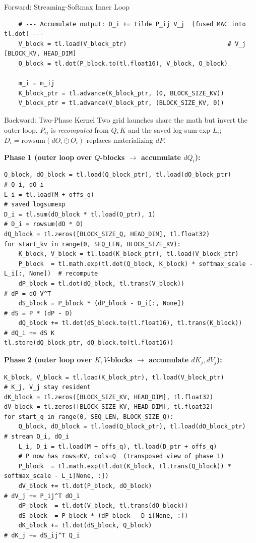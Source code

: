 \begin{frame}[fragile]{Forward: Streaming-Softmax Inner Loop}
\begin{lstlisting}
    # --- Accumulate output: O_i += tilde P_ij V_j  (fused MAC into tl.dot) ---
    V_block = tl.load(V_block_ptr)                            # V_j   [BLOCK_KV, HEAD_DIM]
    O_block = tl.dot(P_block.to(tl.float16), V_block, O_block)

    m_i = m_ij
    K_block_ptr = tl.advance(K_block_ptr, (0, BLOCK_SIZE_KV))
    V_block_ptr = tl.advance(V_block_ptr, (BLOCK_SIZE_KV, 0))
\end{lstlisting}
\end{frame}

\begin{frame}[fragile]{Backward: Two-Phase Kernel}
  Two grid launches share the math but invert the outer loop. $P_{ij}$ is
  \emph{recomputed} from $Q,K$ and the saved log-sum-exp $L_i$;
  $D_i = \mathrm{rowsum}(dO_i \odot O_i)$ replaces materializing $dP$.

  \textbf{Phase 1 (outer loop over $Q$-blocks $\to$ accumulate $dQ_i$):}
\begin{lstlisting}
Q_block, dO_block = tl.load(Q_block_ptr), tl.load(dO_block_ptr)        # Q_i, dO_i
L_i = tl.load(M + offs_q)                                              # saved logsumexp
D_i = tl.sum(dO_block * tl.load(O_ptr), 1)                             # D_i = rowsum(dO * O)
dQ_block = tl.zeros([BLOCK_SIZE_Q, HEAD_DIM], tl.float32)
for start_kv in range(0, SEQ_LEN, BLOCK_SIZE_KV):
    K_block, V_block = tl.load(K_block_ptr), tl.load(V_block_ptr)
    P_block  = tl.math.exp(tl.dot(Q_block, K_block) * softmax_scale - L_i[:, None])  # recompute
    dP_block = tl.dot(dO_block, tl.trans(V_block))                     # dP = dO V^T
    dS_block = P_block * (dP_block - D_i[:, None])                     # dS = P * (dP - D)
    dQ_block += tl.dot(dS_block.to(tl.float16), tl.trans(K_block))     # dQ_i += dS K
tl.store(dQ_block_ptr, dQ_block.to(tl.float16))
\end{lstlisting}

  \textbf{Phase 2 (outer loop over $K,V$-blocks $\to$ accumulate $dK_j, dV_j$):}
\begin{lstlisting}
K_block, V_block = tl.load(K_block_ptr), tl.load(V_block_ptr)          # K_j, V_j stay resident
dK_block = tl.zeros([BLOCK_SIZE_KV, HEAD_DIM], tl.float32)
dV_block = tl.zeros([BLOCK_SIZE_KV, HEAD_DIM], tl.float32)
for start_q in range(0, SEQ_LEN, BLOCK_SIZE_Q):
    Q_block, dO_block = tl.load(Q_block_ptr), tl.load(dO_block_ptr)    # stream Q_i, dO_i
    L_i, D_i = tl.load(M + offs_q), tl.load(D_ptr + offs_q)
    # P now has rows=KV, cols=Q  (transposed view of phase 1)
    P_block  = tl.math.exp(tl.dot(K_block, tl.trans(Q_block)) * softmax_scale - L_i[None, :])
    dV_block += tl.dot(P_block, dO_block)                              # dV_j += P_ij^T dO_i
    dP_block  = tl.dot(V_block, tl.trans(dO_block))
    dS_block  = P_block * (dP_block - D_i[None, :])
    dK_block += tl.dot(dS_block, Q_block)                              # dK_j += dS_ij^T Q_i
\end{lstlisting}
\end{frame}

